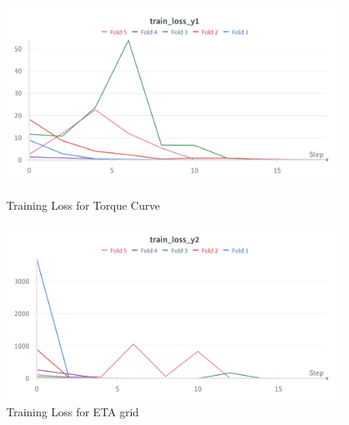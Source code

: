\documentclass{report} %
\begin{document}
\begin{figure}[h]
    \centering
    \begin{minipage}[b]{0.3\textwidth}
        \includegraphics[width=\textwidth]{./ReportImages/train_loss_y1.png}
        \caption{Training Loss for Torque Curve}
        \label{fig:Training Loss for Torque Curve}
    \end{minipage}
    \hfill
    \begin{minipage}[b]{0.3\textwidth}
        \includegraphics[width=\textwidth]{./ReportImages/train_loss_y2.png}
        \caption{Training Loss for ETA grid}
        \label{fig:Training Loss for ETA grid}
    \end{minipage}
\end{figure}
\end{document}
